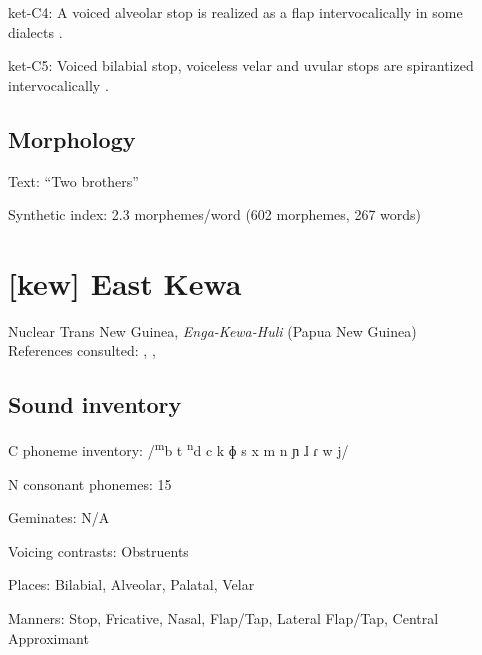 {\begin{appendixdesc}
\item[ket-C4:] A voiced alveolar stop is realized as a flap intervocalically in some dialects \citep[76]{Georg2007}.

\item[ket-C5:] Voiced bilabial stop, voiceless velar and uvular stops are spirantized intervocalically \citep[75--78]{Georg2007}.
\end{appendixdesc}
\subsection*{Morphology}

\begin{appendixdesc}

\item[Text:] “Two brothers” \citep[92--97]{Vajda2004}

\item[Synthetic index:] 2.3 morphemes/word (602 morphemes, 267 words)
\end{appendixdesc}
\section*{[kew] East Kewa} %
Nuclear Trans New Guinea, \textit{Enga-Kewa-Huli} (Papua New Guinea)\medskip\\
References consulted: \citet{Franklin1971}, \citet{FranklinFranklin1962}, \citet{FranklinFranklin1978}

\subsection*{Sound inventory}
\begin{appendixdesc}

\item[C phoneme inventory:] /\textsuperscript{m}b t \textsuperscript{n}d c k ɸ s x m n ɲ ɺ ɾ w j/

\item[N consonant phonemes:] 15

\item[Geminates:] N/A

\item[Voicing contrasts:] Obstruents

\item[Places:] Bilabial, Alveolar, Palatal, Velar

\item[Manners:] Stop, Fricative, Nasal, Flap/Tap, Lateral Flap/Tap, Central Approximant


\end{appendixdesc}}
